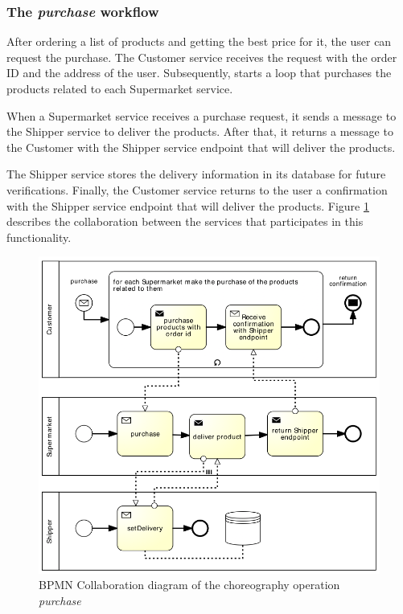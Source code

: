 \subsubsection{The \emph{purchase} workflow}
After ordering a list of products and getting the best price for it, the user can request the purchase. The Customer service receives the request with the order ID and the address of the user. Subsequently, starts a loop that purchases the products related to each Supermarket service.

When a Supermarket service receives a purchase request, it sends a message to the Shipper service to deliver the products. After that, it returns a message to the Customer with the Shipper service endpoint that will deliver the products.

The Shipper service stores the delivery information in its database for future verifications. Finally, the Customer service returns to the user a confirmation with the Shipper service endpoint that will deliver the products. Figure \ref{purchaseworkflow} describes the collaboration between the services that participates in this functionality.

\begin{figure}[htbp]
\begin{center}
	\includegraphics{images/purchaseworkflow}
\caption{BPMN Collaboration diagram of the choreography operation \emph{purchase}}
\label{purchaseworkflow}
\end{center}
\end{figure}

